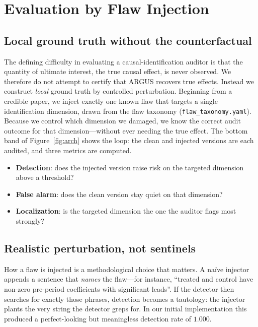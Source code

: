 \section{Evaluation by Flaw Injection}
\label{sec:evaluation}

\subsection{Local ground truth without the counterfactual}
The defining difficulty in evaluating a causal-identification auditor is that the
quantity of ultimate interest, the true causal effect, is never observed. We
therefore do not attempt to certify that ARGUS recovers true effects. Instead we
construct \emph{local} ground truth by controlled perturbation. Beginning from a
credible paper, we inject exactly one known flaw that targets a single
identification dimension, drawn from the flaw taxonomy
(\texttt{flaw\_taxonomy.yaml}). Because we control which dimension we damaged, we
know the correct audit outcome for that dimension---without ever needing the true
effect. The bottom band of Figure~\ref{fig:arch} shows the loop: the clean and
injected versions are each audited, and three metrics are computed.

\begin{itemize}
  \item \textbf{Detection}: does the injected version raise risk on the targeted
        dimension above a threshold?
  \item \textbf{False alarm}: does the clean version stay quiet on that
        dimension?
  \item \textbf{Localization}: is the targeted dimension the one the auditor
        flags most strongly?
\end{itemize}

\subsection{Realistic perturbation, not sentinels}
How a flaw is injected is a methodological choice that matters. A na\"ive injector
appends a sentence that \emph{names} the flaw---for instance, ``treated and
control have non-zero pre-period coefficients with significant leads''. If the
detector then searches for exactly those phrases, detection becomes a tautology:
the injector plants the very string the detector greps for. In our initial
implementation this produced a perfect-looking but meaningless detection rate of
$1.000$.

